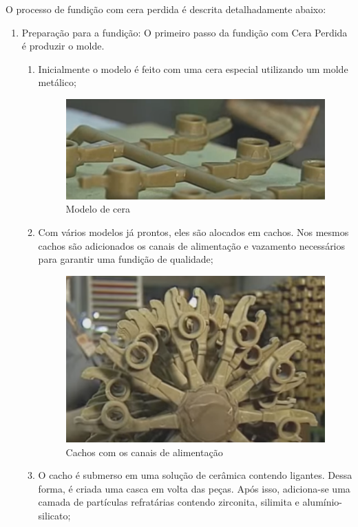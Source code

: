 \documentclass[a4paper, 12pt]{article}
\begin{document}
		O processo de fundição com cera perdida é descrita detalhadamente abaixo:
	\begin{enumerate}
	\item Preparação para a fundição: O primeiro passo da fundição com Cera Perdida é produzir o molde.
		\begin{enumerate}
			\item Inicialmente o modelo é feito com uma cera especial utilizando um molde metálico;
				\begin{figure}[h]
					\centering
					\includegraphics[scale=0.5]{a5.png}
					\caption{Modelo de cera}
				\end{figure}
			\item Com vários modelos já prontos, eles são alocados em cachos. Nos mesmos cachos são adicionados os canais de alimentação e vazamento necessários para garantir uma fundição de qualidade;
				\begin{figure}[h]
					\centering
					\includegraphics[scale=0.5]{a6.png}
					\caption{Cachos com os canais de alimentação}
				\end{figure}
			\item O cacho é submerso em uma solução de cerâmica contendo ligantes. Dessa forma, é criada uma casca em volta das peças. Após isso, adiciona-se uma camada de partículas refratárias contendo zirconita, silimita e alumínio-silicato;

\end{enumerate}
\end{enumerate}
\end{document}
